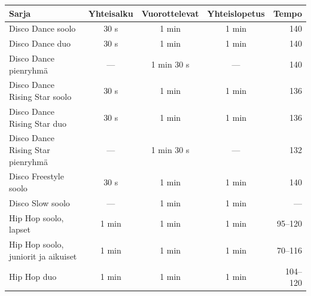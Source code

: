 \documentclass[12pt, a4paper, oneside]{article}
\begin{document}
\begin{table}[ht]
    \centering
    \setlength\tabcolsep{9pt}
    \small
    \renewcommand{\arraystretch}{1.5}
    \begin{tabular}{@{\hspace{0.25cm}}lcccr@{\hspace{0.25cm}}}
        \toprule
        \textbf{Sarja}                                  & \textbf{Yhteisalku} & \textbf{Vuorottelevat} & \textbf{Yhteislopetus} & \textbf{Tempo} \\ \midrule
        Disco Dance soolo                               & 30 s                & 1 min                  & 1 min                  & 140            \\
        Disco Dance duo                                 & 30 s                & 1 min                  & 1 min                  & 140            \\
        Disco Dance pienryhmä                           & ---                 & 1 min 30 s             & ---                    & 140            \\
        Disco Dance Rising Star soolo                   & 30 s                & 1 min                  & 1 min                  & 136            \\
        Disco Dance Rising Star duo                     & 30 s                & 1 min                  & 1 min                  & 136            \\
        Disco Dance Rising Star pienryhmä               & ---                 & 1 min 30 s             & ---                    & 132            \\
        Disco Freestyle soolo                           & 30 s                & 1 min                  & 1 min                  & 140            \\
        Disco Slow soolo                                & ---                 & 1 min                  & 1 min                  & ---            \\ \midrule
        Hip Hop soolo, lapset                           & 1 min               & 1 min                  & 1 min                  & 95--120        \\
        Hip Hop soolo, juniorit ja aikuiset             & 1 min               & 1 min                  & 1 min                  & 70--116        \\
        Hip Hop duo                                     & 1 min               & 1 min                  & 1 min                  & 104--120       \\

\end{tabular}
\end{table}
\end{document}
